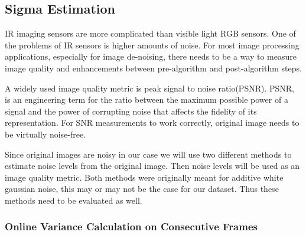 \documentclass[10pt,twocolumn,letterpaper]{article}
\begin{document}
\subsection{Sigma Estimation}
IR imaging sensors are more complicated than visible light RGB sensors. One of the problems of IR sensors is higher amounts of noise.
For most image processing applications, especially for image de-noising, there needs to be a way to measure image quality and enhancements between pre-algorithm and post-algorithm steps.

A widely used image quality metric is peak signal to noise ratio(PSNR). PSNR, is an engineering term for the ratio between the maximum possible power of a signal and the power of corrupting noise that affects the fidelity of its representation\cite{psnr-wiki}. For SNR measurements to work correctly, original image needs to be virtually noise-free.

Since original images are noisy in our case we will use two different methods to estimate noise levels from the original image. Then noise levels will be used as an image quality metric. Both methods were originally meant for additive white gaussian noise, this may or may not be the case for our dataset. Thus these methods need to be evaluated as well.
\subsubsection{Online Variance Calculation on Consecutive Frames}
\end{document}
